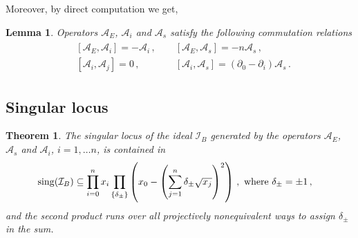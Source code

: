 \documentclass[11pt]{article}
\newtheorem{theorem}{Theorem}
\newtheorem{lemma}{Lemma}
\begin{document}
Moreover, by direct computation we get,
\begin{lemma}
Operators $\mathcal{A}_{E}$, $\mathcal{A}_{i}$ and $\mathcal{A}_{s}$ satisfy the following commutation relations
\begin{align}
\begin{split}
&[\mathcal{A}_{E},\mathcal{A}_{i}] = -\mathcal{A}_{i} \,, \quad \quad [\mathcal{A}_{E},\mathcal{A}_{s}] = -n\mathcal{A}_{s} \,, \\
&[\mathcal{A}_{i},\mathcal{A}_{j}] = 0 \,, \quad \quad \quad \,\,\,\, [\mathcal{A}_{i},\mathcal{A}_{s}] = (\partial_{0} - \partial_{i})\mathcal{A}_{s} \,.
\end{split}
\end{align}
\end{lemma}


\subsection{Singular locus}
\begin{theorem}
The singular locus of the ideal $\mathcal{I}_{B}$ generated by the operators $\mathcal{A}_{E}$, $\mathcal{A}_{s}$ and $\mathcal{A}_{i}$, $i=1,\hdots n$, is contained in
\begin{align}\label{eq:sing_loc}
&{\rm sing}(\mathcal{I}_{B}) \subseteq \prod_{i=0}^{n} x_{i} \prod_{\lbrace \delta_{\pm} \rbrace} \left(x_{0}-\left(\sum_{j=1}^{n} \delta_{\pm} \sqrt{x_{j}} \right)^{2} \right) \,, \text{ where } \delta_{\pm} = \pm 1 \,,
\end{align}
and the second product runs over all projectively nonequivalent ways to assign $\delta_{\pm}$ in the sum.
\end{theorem}
\end{document}
